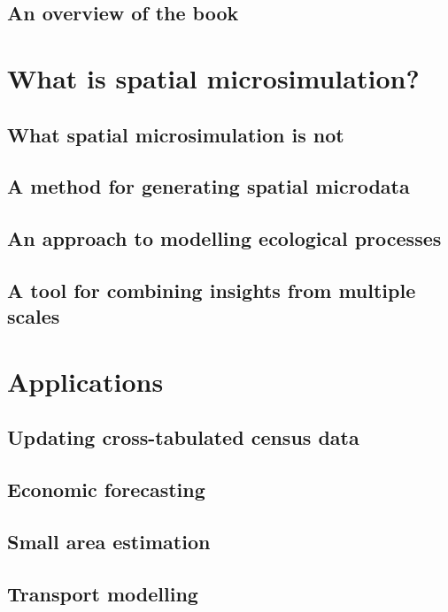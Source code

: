 \documentclass[a5paper, 11pt, twoside]{book}  %
\begin{document}
\section{An overview of the book}


\chapter{What is spatial microsimulation?}

\section{What spatial microsimulation is not}

\section{A method for generating spatial microdata}

\section{An approach to modelling ecological processes}

\section{A tool for combining insights from multiple scales}

\chapter{Applications}


\section{Updating cross-tabulated census data}

\section{Economic forecasting}

\section{Small area estimation}

\section{Transport modelling}
\end{document}
